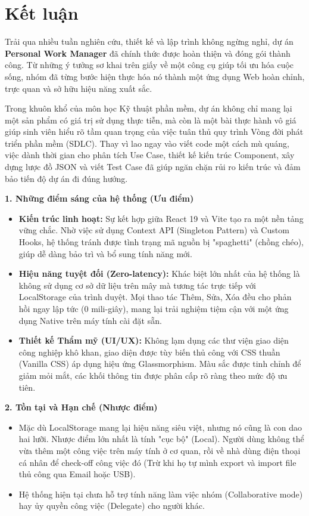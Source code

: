 \section*{Kết luận}

Trải qua nhiều tuần nghiên cứu, thiết kế và lập trình không ngừng nghỉ, dự án \textbf{Personal Work Manager} đã chính thức được hoàn thiện và đóng gói thành công. Từ những ý tưởng sơ khai trên giấy về một công cụ giúp tối ưu hóa cuộc sống, nhóm đã từng bước hiện thực hóa nó thành một ứng dụng Web hoàn chỉnh, trực quan và sở hữu hiệu năng xuất sắc.

Trong khuôn khổ của môn học Kỹ thuật phần mềm, dự án không chỉ mang lại một sản phẩm có giá trị sử dụng thực tiễn, mà còn là một bài thực hành vô giá giúp sinh viên hiểu rõ tầm quan trọng của việc tuân thủ quy trình Vòng đời phát triển phần mềm (SDLC). Thay vì lao ngay vào viết code một cách mù quáng, việc dành thời gian cho phân tích Use Case, thiết kế kiến trúc Component, xây dựng lược đồ JSON và viết Test Case đã giúp ngăn chặn rủi ro kiến trúc và đảm bảo tiến độ dự án đi đúng hướng.

\textbf{1. Những điểm sáng của hệ thống (Ưu điểm)}
\begin{itemize}
    \item \textbf{Kiến trúc linh hoạt:} Sự kết hợp giữa React 19 và Vite tạo ra một nền tảng vững chắc. Nhờ việc sử dụng Context API (Singleton Pattern) và Custom Hooks, hệ thống tránh được tình trạng mã nguồn bị "spaghetti" (chồng chéo), giúp dễ dàng bảo trì và bổ sung tính năng mới.
    \item \textbf{Hiệu năng tuyệt đối (Zero-latency):} Khác biệt lớn nhất của hệ thống là không sử dụng cơ sở dữ liệu trên mây mà tương tác trực tiếp với LocalStorage của trình duyệt. Mọi thao tác Thêm, Sửa, Xóa đều cho phản hồi ngay lập tức (0 mili-giây), mang lại trải nghiệm tiệm cận với một ứng dụng Native trên máy tính cài đặt sẵn.
    \item \textbf{Thiết kế Thẩm mỹ (UI/UX):} Không lạm dụng các thư viện giao diện công nghiệp khô khan, giao diện được tùy biến thủ công với CSS thuần (Vanilla CSS) áp dụng hiệu ứng Glassmorphism. Màu sắc được tinh chỉnh để giảm mỏi mắt, các khối thông tin được phân cấp rõ ràng theo mức độ ưu tiên.
\end{itemize}

\textbf{2. Tồn tại và Hạn chế (Nhược điểm)}
\begin{itemize}
    \item Mặc dù LocalStorage mang lại hiệu năng siêu việt, nhưng nó cũng là con dao hai lưỡi. Nhược điểm lớn nhất là tính "cục bộ" (Local). Người dùng không thể vừa thêm một công việc trên máy tính ở cơ quan, rồi về nhà dùng điện thoại cá nhân để check-off công việc đó (Trừ khi họ tự mình export và import file thủ công qua Email hoặc USB).
    \item Hệ thống hiện tại chưa hỗ trợ tính năng làm việc nhóm (Collaborative mode) hay ủy quyền công việc (Delegate) cho người khác.
\end{itemize}

